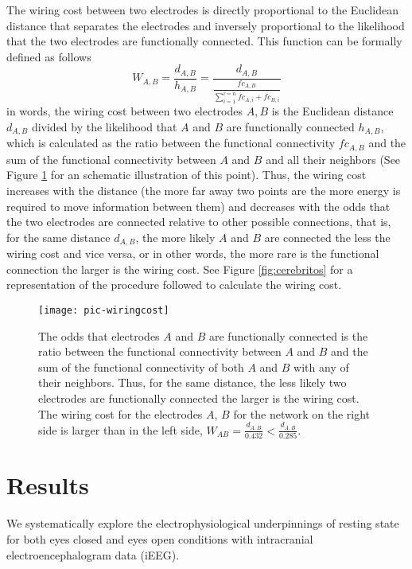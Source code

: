 \documentclass[11pt, onecolumn]{article}
\begin{document}
The wiring cost between two electrodes is directly proportional to the Euclidean distance that separates the electrodes and inversely proportional to the likelihood that the two electrodes are functionally connected. This function can be formally  defined as follows
\begin{equation}
 W_{A,B} = \frac{d_{A,B}}{h_{A,B}} =  \frac{d_{A,B}}{\frac{fc_{A,B}}{\sum_{i=1}^{i=n}fc_{A,i} + fc_{B,i}}}
 \label{eq:wc}
\end{equation}
in words, the wiring cost between two electrodes $A,B$ is the Euclidean distance $d_{A,B}$ divided by the likelihood that $A$ and $B$ are functionally connected $h_{A,B}$, which is calculated as the ratio between the functional connectivity $fc_{A,B}$ and the sum of the functional connectivity between $A$ and $B$ and all their neighbors (See Figure \ref{fig:wc} for an schematic illustration of this point). Thus, the wiring cost increases with the distance (the more far away two points are the  more energy is required to move information between them) and decreases with the odds that the two electrodes are connected relative to other possible connections, that is, for the same distance $d_{A,B}$, the more likely $A$ and $B$ are connected the less the wiring cost and vice versa, or in other words, the more rare is the functional connection the larger is the wiring cost. See Figure \ref{fig:cerebritos} for a representation of the procedure followed to calculate the wiring cost.

\begin{figure}
  \centering
  \texttt{[image: pic-wiringcost]} 
  \caption{The odds that electrodes $A$ and $B$ are functionally connected is the ratio between the functional connectivity between $A$ and $B$ and the sum of the functional connectivity of both $A$ and $B$ with any of their neighbors. Thus, for the same distance, the less likely two electrodes are functionally connected the larger is the wiring cost. The wiring cost for the electrodes $A$, $B$ for the network on the right side is larger than in the left side, $W_{AB} = \frac{d_{A,B}}{0.432} <  \frac{d_{A,B}}{0.285}$.}
  \label{fig:wc} 
\end{figure}

\section{Results}
We systematically explore the electrophysiological underpinnings of resting state for both eyes closed and eyes open conditions with intracranial electroencephalogram data (iEEG).
\end{document}
